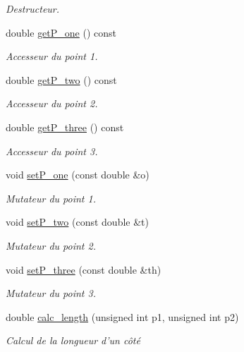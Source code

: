 \begin{DoxyCompactItemize}
\begin{DoxyCompactList}\small\item\em Destructeur. \end{DoxyCompactList}\item 
double \hyperlink{class_point_a211f8dee098122a2f1c326ba42652ee2}{get\-P\-\_\-one} () const 
\begin{DoxyCompactList}\small\item\em Accesseur du point 1. \end{DoxyCompactList}\item 
double \hyperlink{class_point_afd9ee8dca2913903fd6a1a95d743afaa}{get\-P\-\_\-two} () const 
\begin{DoxyCompactList}\small\item\em Accesseur du point 2. \end{DoxyCompactList}\item 
double \hyperlink{class_point_adf0f89d9beca24315b45d96786896a56}{get\-P\-\_\-three} () const 
\begin{DoxyCompactList}\small\item\em Accesseur du point 3. \end{DoxyCompactList}\item 
void \hyperlink{class_point_ac79f8c3f0fb8b9dea4f5b8a8e0315779}{set\-P\-\_\-one} (const double \&o)
\begin{DoxyCompactList}\small\item\em Mutateur du point 1. \end{DoxyCompactList}\item 
void \hyperlink{class_point_a3b70e89e253f5339392990ae29313ae8}{set\-P\-\_\-two} (const double \&t)
\begin{DoxyCompactList}\small\item\em Mutateur du point 2. \end{DoxyCompactList}\item 
void \hyperlink{class_point_a097d97049b319bb131b51f990a52aa94}{set\-P\-\_\-three} (const double \&th)
\begin{DoxyCompactList}\small\item\em Mutateur du point 3. \end{DoxyCompactList}\item 
double \hyperlink{class_point_a6b523817c6565922eb02e15225ba4b82}{calc\-\_\-length} (unsigned int p1, unsigned int p2)
\begin{DoxyCompactList}\small\item\em Calcul de la longueur d'un côté \end{DoxyCompactList}\end{DoxyCompactItemize}
